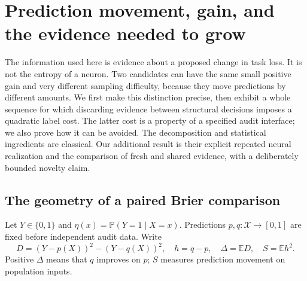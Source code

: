 \section{Prediction movement, gain, and the evidence needed to grow}
\label{sec:movement-theory}

The information used here is evidence about a proposed change in task loss.
It is not the entropy of a neuron. Two candidates can have the same small
positive gain and very different sampling difficulty, because they move
predictions by different amounts. We first make this distinction precise,
then exhibit a whole sequence for which discarding evidence between
structural decisions imposes a quadratic label cost. The latter cost is a
property of a specified audit interface; we also prove how it can be avoided.
The decomposition and statistical ingredients are classical. Our additional
result is their explicit repeated neural realization and the comparison of
fresh and shared evidence, with a deliberately bounded novelty claim.

\subsection{The geometry of a paired Brier comparison}

Let $Y\in\{0,1\}$ and $\eta(x)=\mathbb P(Y=1\mid X=x)$.
Predictions $p,q:\mathcal X\to[0,1]$ are fixed before independent audit data.
Write
\begin{equation}
 D=(Y-p(X))^2-(Y-q(X))^2,\quad h=q-p,\quad
 \Delta=\mathbb ED,\quad S=\mathbb E h^2.
 \label{eq:movement-def}
\end{equation}
Positive $\Delta$ means that $q$ improves on $p$; $S$ measures prediction
movement on population inputs.

